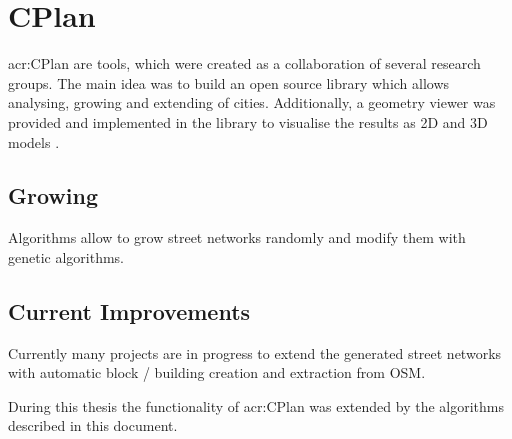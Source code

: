 \section{CPlan}
\label{CPlan}
\gls{acr:CPlan} are tools, which were created as a collaboration of several research groups. The main idea was to build an open source library which allows analysing, growing and extending of cities. Additionally, a geometry viewer was provided and implemented in the library to visualise the results as 2D and 3D models \citep{cPlan:2015}.

\subsection{Growing}
Algorithms allow to grow street networks randomly and modify them with genetic algorithms.

\subsection{Current Improvements}
Currently many projects are in progress to extend the generated street networks with automatic block / building creation and extraction from \gls{OSM}.

During this thesis the functionality of \gls{acr:CPlan} was extended by the algorithms described in this document.